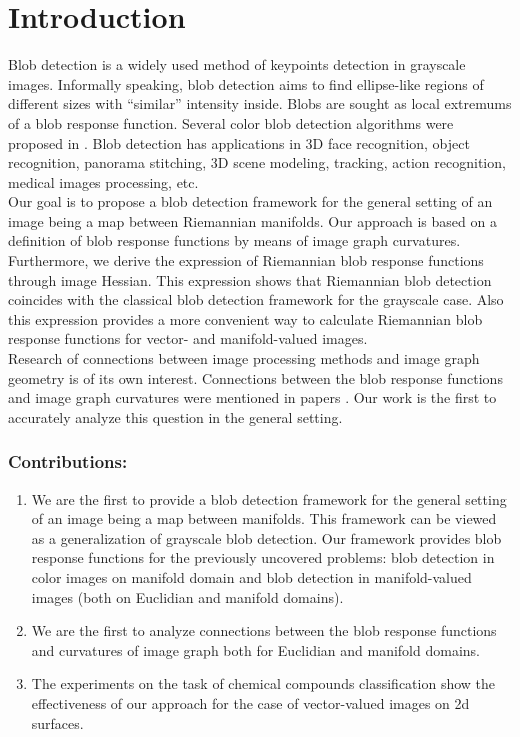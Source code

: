 \documentclass{llncs}
\begin{document}
\section{Introduction}
%
Blob detection \cite{blob} is a widely used method of keypoints detection in grayscale images. Informally speaking, blob detection aims to find ellipse-like regions of different sizes with “similar” intensity inside. Blobs are sought as local extremums of a blob response function. Several color blob detection algorithms were proposed in \cite{ColorBlob,GROM}. Blob detection has applications in 3D face recognition, object recognition, panorama stitching, 3D scene modeling, tracking, action recognition, medical images processing, etc.
\\
Our goal is to propose a blob detection framework for the general setting of an image being a map between Riemannian manifolds. Our approach is based on a definition of blob response functions by means of image graph curvatures. Furthermore, we derive the expression of Riemannian blob response functions through image Hessian. This expression shows that Riemannian blob detection coincides with the classical blob detection framework for the grayscale case. Also this expression provides a more convenient way to calculate Riemannian blob response functions for vector- and manifold-valued images.
\\
Research of connections between image processing methods and image graph geometry \cite{Saucan,Kimmel,Batard} is of its own interest. Connections between the blob response functions and image graph curvatures were mentioned in papers \cite{BlobCurv1,BlobCurv2}. Our work is the first to accurately analyze this question in the general setting.

\subsubsection{Contributions:}
\begin{enumerate}
\item We are the first to provide a blob detection framework for the general setting of an image being a map between manifolds. This framework can be viewed as a generalization of grayscale blob detection. Our framework provides blob response functions for the previously uncovered problems: blob detection in color images on manifold domain and blob detection in manifold-valued images (both on Euclidian and manifold domains). 
\item We are the first to analyze connections between the blob response functions and curvatures of image graph both for Euclidian and manifold domains.
\item The experiments on the task of chemical compounds classification show the effectiveness of our approach for the case of vector-valued images on 2d surfaces.  
\end{enumerate}
\end{document}
